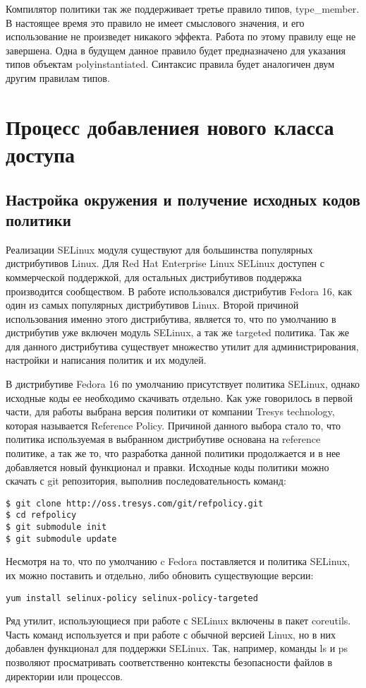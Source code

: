 \documentclass{./../class/UIR}
\begin{document}
    Компилятор политики так же поддерживает третье правило типов, 
    type\_member.
    В настоящее время это правило не имеет смыслового значения, и его
    использование не произведет никакого эффекта. Работа по этому правилу еще не
    завершена. Одна в будущем данное правило будет предназначено для указания
    типов объектам polyinstantiated. Синтаксис правила будет аналогичен двум
    другим правилам типов.


\section{Процесс добавлениея нового класса доступа}
\subsection{Настройка окружения и получение исходных кодов политики}
	Реализации SELinux модуля существуют для большинства популярных дистрибутивов
	Linux. Для Red Hat Enterprise Linux SELinux доступен с коммерческой поддержкой,
	для остальных дистрибутивов поддержка производится сообществом. В работе
	использовался дистрибутив Fedora 16, как один из самых популярных дистрибутивов
	Linux. Второй причиной использования именно этого дистрибутива, является то,
	что по умолчанию в дистрибутив уже включен модуль SELinux, а так же targeted
	политика. Так же для данного дистрибутива существует множество утилит для
	администрирования, настройки и написания политик и их модулей.
	
	В дистрибутиве Fedora 16 по умолчанию присутствует политика SELinux, однако
	исходные коды ее необходимо скачивать отдельно. Как уже говорилось в первой
	части, для работы выбрана версия политики от компании Tresys technology,
	которая называется Reference Policy. Причиной данного выбора стало то, что
	политика используемая в выбранном дистрибутиве основана на reference политике,
	а так же то, что разработка данной политики продолжается и в нее добавляется
	новый функционал и правки. Исходные коды политики можно скачать с git
	репозитория, выполнив последовательность команд:
\begin{verbatim}
$ git clone http://oss.tresys.com/git/refpolicy.git
$ cd refpolicy
$ git submodule init
$ git submodule update
\end{verbatim}
	Несмотря на то, что по умолчанию c Fedora поставляется и политика SELinux, их
	можно поставить и отдельно, либо обновить существующие версии:
\begin{verbatim}
yum install selinux-policy selinux-policy-targeted
\end{verbatim}
	Ряд утилит, использующиеся при работе с SELinux включены в пакет coreutils.
	Часть команд используется и при работе с обычной версией Linux, но в них
	добавлен функционал для поддержки SELinux. Так, например, команды ls и ps
	позволяют просматривать соответственно контексты безопасности файлов в
	директории или процессов.
	
\end{document}
